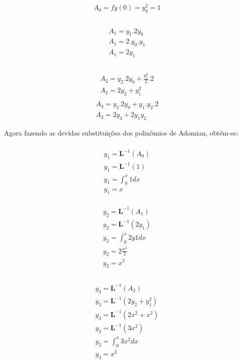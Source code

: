 \begin{gather*}
  A_{0} = fy(0) = y_{0}^2 = 1
\end{gather*}
\nonumber\\
\begin{gather*}\nonumber\\
  A_{1} = y_{1}.2y_{0} \nonumber\\
  A_{1} = 2.y_{0}.y_{1}\nonumber\\
  A_{1} = 2y_{1}\nonumber\\
\end{gather*}\nonumber\\
\begin{gather*}
A_{2} = y_{2}.2y_{0} + \frac{y_{1}^{2}}{2}.2 \nonumber\\
  A_{2} = 2y_{2} + y_{1}^2\nonumber\\
  \end{gather*}
\begin{gather*}
  A_{3} = y_{3}.2y_{0} + y_{1}.y_{2}.2 \nonumber\\
  A_{3} = 2y_{3} + 2y_{1}y_{2}
 \end{gather*}

Agora fazendo as devidas substituições dos polinômios de Adomian, obtém-se:

\begin{gather*}\nonumber\\
y_{1} = \textbf{L}^{-1} (A_{0})\nonumber\\
  y_{1} = \textbf{L}^{-1} (1)\nonumber\\
  y_{1} = \int_0^{x}1dx\nonumber\\
  y_{1} = x
\end{gather*}

\begin{gather*}\nonumber\\
y_{2} = \textbf{L}^{-1} (A_{1})\nonumber\\
  y_{2} = \textbf{L}^{-1}(2y_{1})\nonumber\\
  y_{2} = \int_0^{x}2y1dx\nonumber\\
  y_{2} = 2\frac {x^{2}}{2}\nonumber\\
  y_{2} = x^2\nonumber\\
\end{gather*}


\begin{gather*}\nonumber\\
y_{3} = \textbf{L}^{-1} (A_{2})\nonumber\\
  y_{3} = \textbf{L}^{-1}(2y_{2} + y_{1}^2)\nonumber\\
  y_{3} = \textbf{L}^{-1}(2x^2 + x^2)\nonumber\\
  y_{3} = \textbf{L}^{-1}(3x^2)\nonumber\\
  y_{3} = \int_0^{x}3x^2dx\nonumber\\
  y_{3} = x^3\nonumber\\
\end{gather*}

